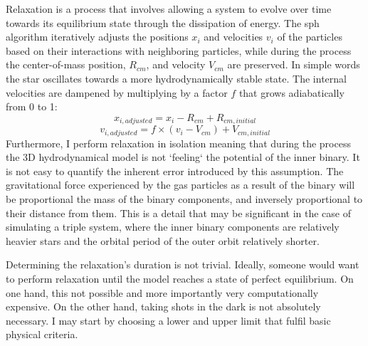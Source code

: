Relaxation is a process that involves allowing a system to evolve over time towards its equilibrium state through the dissipation of energy. The \ac{sph} algorithm iteratively adjusts the positions $x_i$ and velocities $v_i$ of the particles based on their interactions with neighboring particles, while during the process the center-of-mass position, $R_{cm}$, and velocity $V_{cm}$ are preserved. In simple words the star oscillates towards a more hydrodynamically stable state. The internal velocities are dampened by multiplying by a factor $f$ that grows adiabatically from 0 to 1:
\begin{equation}\label{eq:adjust_positions}
    x_{i,adjusted} = x_i - R_{cm} + R_{cm,initial}
\end{equation}
\begin{equation}\label{eq:adjust_velocities}
    v_{i,adjusted} = f \times (v_i - V_{cm}) + V_{cm,initial}
\end{equation} 
Furthermore, I perform relaxation in isolation meaning that during the process the 3D hydrodynamical model is not `feeling` the potential of the inner binary. It is not easy to quantify the inherent error introduced by this assumption. The gravitational force experienced by the gas particles as a result of the binary will be proportional the mass of the binary components, and inversely proportional to their distance from them. This is a detail that may be significant in the case of simulating a triple system, where the inner binary components are relatively heavier stars and the orbital period of the outer orbit relatively shorter.

Determining the relaxation's duration is not trivial. Ideally, someone would want to perform relaxation until the model reaches a state of perfect equilibrium. On one hand, this not possible and more importantly very computationally expensive. On the other hand, taking shots in the dark is not absolutely necessary. I may start by choosing a lower and upper limit that fulfil basic physical criteria.

